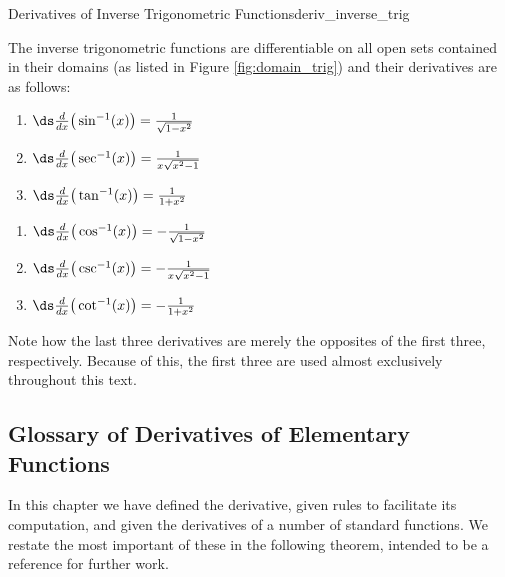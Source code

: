 \begin{theorem}{Derivatives of Inverse Trigonometric Functions}{deriv_inverse_trig}
{The inverse trigonometric functions are differentiable on all open sets contained in their domains (as listed in Figure \ref{fig:domain_trig}) and their derivatives are as follows:\\

\noindent	\begin{minipage}{.5\textwidth}\small
	\begin{enumerate}
	\item		$\ds \frac{d}{dx}\big(\sin^{-1}(x)\big) = \frac{1}{\sqrt{1-x^2}}$ 
	\item		$\ds \frac{d}{dx}\big(\sec^{-1}(x)\big) = \frac{1}{ x \sqrt{x^2-1}}$
	\item		$\ds \frac{d}{dx}\big(\tan^{-1}(x)\big) = \frac{1}{1+x^2}$
	\end{enumerate}
	\end{minipage}
	\begin{minipage}{.5\textwidth}\small
	\begin{enumerate}\addtocounter{enumi}{3}
	\item		$\ds \frac{d}{dx}\big(\cos^{-1}(x)\big) = -\frac{1}{\sqrt{1-x^2}}$ 
	\item		$\ds \frac{d}{dx}\big(\csc^{-1}(x)\big) = -\frac{1}{ x \sqrt{x^2-1}}$
	\item		$\ds \frac{d}{dx}\big(\cot^{-1}(x)\big) = -\frac{1}{1+x^2}$
	\end{enumerate}
	\normalsize
	\end{minipage}
}			


\end{theorem}

Note how the last three derivatives are merely the opposites of the first three, respectively. Because of this, the first three are used almost exclusively throughout this text.\\


\subsection{Glossary of Derivatives of Elementary Functions}

In this chapter we have defined the derivative, given rules to facilitate its computation, and given the derivatives of a number of standard functions. We restate the most important of these in the following theorem, intended to be a reference for further work.

